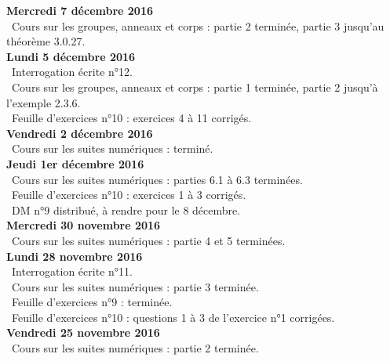 \documentclass[12pt,a4paper]{article}
\begin{document}
\noindent\textbf{Mercredi 7 décembre 2016}\\
\bu\ Cours sur les groupes, anneaux et corps :  partie 2 terminée, partie 3 jusqu'au théorème 3.0.27.\vspace{.4cm}\\

\noindent\textbf{Lundi 5 décembre 2016}\\
\bu\ Interrogation écrite n°12.\\
\bu\ Cours sur les groupes, anneaux et corps :  partie 1 terminée, partie 2 jusqu'à l'exemple 2.3.6.\\
\bu\ Feuille d'exercices n°10 : exercices 4 à 11 corrigés.\vspace{.4cm}\\

\noindent\textbf{Vendredi 2 décembre 2016}\\
\bu\ Cours sur les suites numériques : terminé.\vspace{.4cm}\\

\noindent\textbf{Jeudi 1er décembre 2016}\\
\bu\ Cours sur les suites numériques : parties 6.1 à 6.3 terminées. \\
\bu\ Feuille d'exercices n°10 : exercices 1 à 3 corrigés. \\
\bu\ DM n°9 distribué, à rendre pour le 8 décembre.\vspace{.4cm}\\

\noindent\textbf{Mercredi 30 novembre 2016}\\
\bu\ Cours sur les suites numériques : partie 4 et 5 terminées. \vspace{.4cm}\\

\noindent\textbf{Lundi 28 novembre 2016}\\
\bu\ Interrogation écrite n°11.\\
\bu\ Cours sur les suites numériques : partie 3 terminée.\\
\bu\ Feuille d'exercices n°9 : terminée.\\
\bu\ Feuille d'exercices n°10 : questions 1 à 3 de l'exercice n°1 corrigées. \vspace{.4cm}\\

\noindent\textbf{Vendredi 25 novembre 2016}\\
\bu\ Cours sur les suites numériques : partie 2 terminée.\vspace{.4cm}\\
\end{document}
